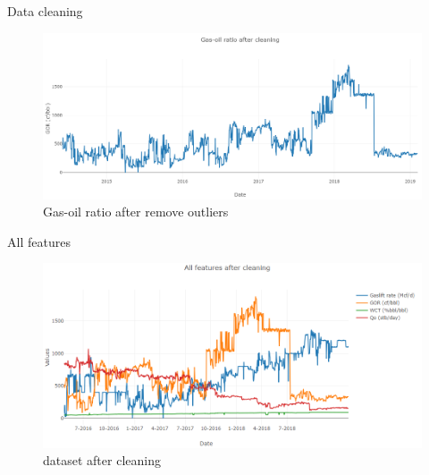 \documentclass[xcolor=table, 11pt]{beamer}
\begin{document}
\begin{frame}{Data cleaning}
    \begin{figure}
        \centering
        \includegraphics[scale=0.38]{fig/gor_after.PNG}
        \caption{Gas-oil ratio after remove outliers}
        \label{fig:gor_after}
    \end{figure}
\end{frame}
\begin{frame}{All features}
    \begin{figure}
        \centering
        \includegraphics[scale=0.45]{fig/after.PNG}
        \caption{dataset after cleaning}
        \label{fig:after}
    \end{figure}
\end{frame}
\end{document}
